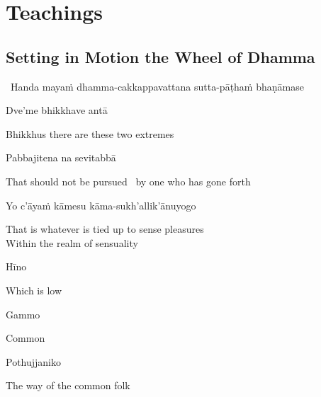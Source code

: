 \ifdesktopversion
{}
\else
{}
\fi

\chapter{Teachings}

\section{Setting in Motion the Wheel of Dhamma}
\label{wheel-of-dhamma-abridged}

\begin{leader}
  \anglebracketleft\ \hspace{-0.5mm}Handa mayaṁ dhamma-cakkappavattana sutta-pāṭhaṁ bhaṇāmase \hspace{-0.5mm}\anglebracketright\
\end{leader}

Dve'me bhikkhave antā

\begin{english}
  Bhikkhus there are these two extremes
\end{english}

Pabbajitena na sevitabbā

\begin{english}
  That should not be pursued \breathmark\ by one who has gone forth
\end{english}

Yo c'āyaṁ kāmesu kāma-sukh'allik'ānuyogo

\begin{english}
  That is whatever is tied up to sense pleasures\\
  Within the realm of sensuality
\end{english}

Hīno

\begin{english}
  Which is low
\end{english}

Gammo

\begin{english}
  Common
\end{english}

Pothujjaniko

\begin{english}
  The way of the common folk
\end{english}

